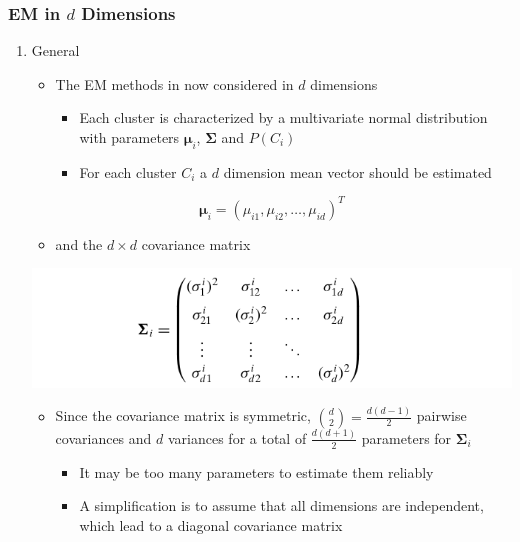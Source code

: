 \documentclass[11pt]{article}
\begin{document}
\subsubsection{EM in \(d\) Dimensions}
\label{sec:orgcde1046}
\begin{enumerate}
\item General
\label{sec:orga56ef7d}
\begin{itemize}
\item The EM methods in now considered in \(d\) dimensions
\begin{itemize}
\item Each cluster is characterized by a multivariate normal distribution with parameters \(\pmb \mu_i\), \(\mathbf \Sigma\) and \(P(C_i)\)
\item For each cluster \(C_i\) a \(d\) dimension mean vector should be estimated
\end{itemize}
\end{itemize}
\begin{equation}
  \pmb \mu_i = (\mu_{i1}, \mu_{i2}, \dots, \mu_{id})^T
\end{equation}
\begin{itemize}
\item and the \(d \times d\) covariance matrix
\end{itemize}
\begin{center}
\includegraphics[width=.9\linewidth]{Representative-based Clustering/screenshot_2018-11-27_20-57-21.png}
\end{center}
\begin{itemize}
\item Since the covariance matrix is symmetric, \(\binom{d}2 = \frac{d(d-1)}2\) pairwise covariances and \(d\) variances for a total of \(\frac{d(d+1)}2\) parameters for \(\mathbf \Sigma_i\)
\begin{itemize}
\item It may be too many parameters to estimate them reliably
\item A simplification is to assume that all dimensions are independent, which lead to a diagonal covariance matrix
\end{itemize}
\end{itemize}
\begin{center}

\end{center}
\end{enumerate}
\end{document}
